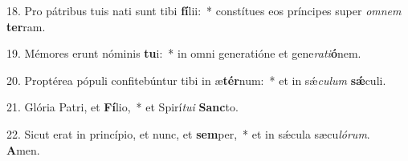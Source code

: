 18. Pro pátribus tuis nati sunt tibi \textbf{fí}lii:~*  constítues eos príncipes super \textit{om}\textit{nem} \textbf{ter}ram.\

19. Mémores erunt nóminis \textbf{tu}i:~*  in omni generatióne et gene\textit{ra}\textit{ti}\textbf{ó}nem.\

20. Proptérea pópuli confitebúntur tibi in æ\textbf{tér}num:~*  et in sǽ\textit{cu}\textit{lum} \textbf{sǽ}culi.\

21. Glória Patri, et \textbf{Fí}lio,~*  et Spirí\textit{tu}\textit{i} \textbf{Sanc}to.\

22. Sicut erat in princípio, et nunc, et \textbf{sem}per,~*  et in sǽcula sæcu\textit{ló}\textit{rum}. \textbf{A}men.\

